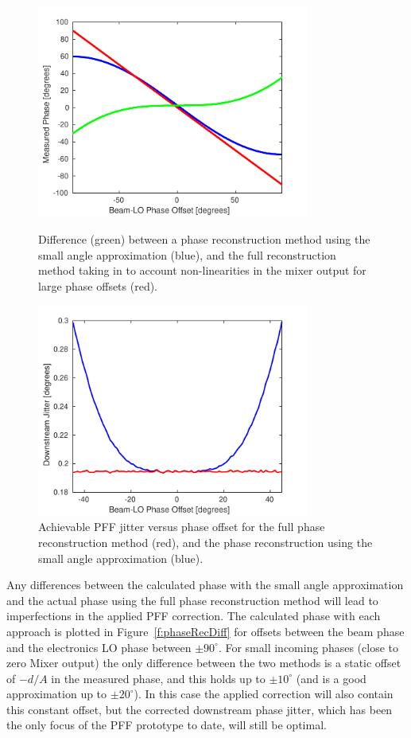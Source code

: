 \begin{figure}
  \centering
  \includegraphics[width=0.8\textwidth]{Figures/commissioning/phaseRecDiff}
  \caption{Difference (green) between a phase reconstruction method using the small angle approximation (blue), and the full reconstruction method taking in to account non-linearities in the mixer output for large phase offsets (red).}
  \label{f:phaseRecDiff}
  \centering
  \includegraphics[width=0.8\textwidth]{Figures/commissioning/phaseRecJitSim}
  \caption{Achievable PFF jitter versus phase offset for the full phase reconstruction method (red), and the phase reconstruction using the small angle approximation (blue).}
  \label{f:phaseRecJitSim}
\end{figure}


Any differences between the calculated phase with the small angle
approximation and the actual phase using the full phase reconstruction
 method will lead to imperfections in the applied PFF correction.
The calculated phase with each approach is plotted in Figure~\ref{f:phaseRecDiff} for offsets between the beam phase and the electronics LO phase between \(\pm90^\circ\). For small incoming phases (close to zero Mixer output) the only difference between the two methods is a static offset of \(-d/A\) in the measured phase, and this holds up to \(\pm10^\circ\) (and is a good approximation up to \(\pm20^\circ\)). In this case the applied correction will also contain this constant offset, but the corrected downstream phase jitter, which has been the only focus of the PFF prototype to date, will still be optimal. 

